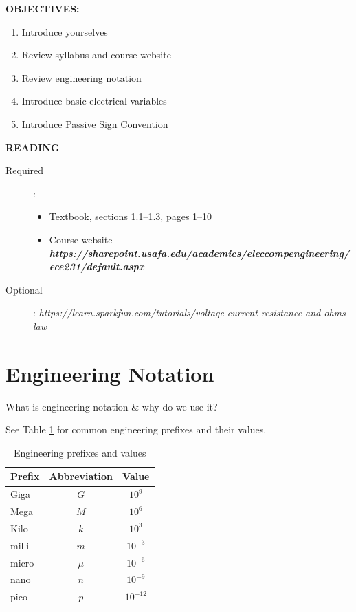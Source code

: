\documentclass{handout}
\begin{document}
\maketitle

\textbf{OBJECTIVES:}
\begin{enumerate}
\item Introduce yourselves
\item Review syllabus and course website
\item Review engineering notation
\item Introduce basic electrical variables
\item Introduce Passive Sign Convention
\end{enumerate}

\textbf{READING}
\begin{description}
\item [Required]:
\begin{itemize}
\item  Textbook, sections 1.1--1.3, pages 1--10
\item Course website \em{\textbf{https://sharepoint.usafa.edu/academics/eleccompengineering/ece231/default.aspx}}\em
\end{itemize}
\item [Optional]: {\em https://learn.sparkfun.com/tutorials/voltage-current-resistance-and-ohms-law}
\end{description}



\section{Engineering Notation}

What is engineering notation \& why do we use it?

See Table \ref{tab: Eng Prefixes} for common engineering prefixes and their values.

\begin{table}[h]
\centering
\begin{tabular}{|l|c|c|}
\hline
Prefix & Abbreviation & Value \\
\hline \hline
Giga & $G$ & $10^9$ \\
Mega & $M$ & $10^6$ \\
Kilo & $k$ & $10^3$ \\
\hline
milli & $m$ & $10^{-3}$ \\
micro & $\mu$ & $10^{-6}$ \\
nano & $n$ & $10^{-9}$ \\
pico & $p$ & $10^{-12}$ \\
\hline
\end{tabular}
\caption{Engineering prefixes and values}
\label{tab: Eng Prefixes}
\end{table}
\end{document}
